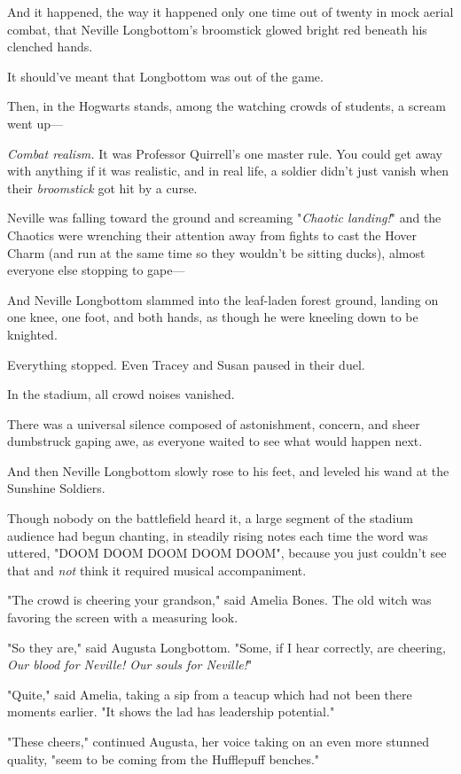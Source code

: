 And it happened, the way it happened only one time out of twenty in mock aerial
combat, that Neville Longbottom's broomstick glowed bright red beneath his
clenched hands.

It should've meant that Longbottom was out of the game.

Then, in the Hogwarts stands, among the watching crowds of students, a scream
went up—

\emph{Combat realism.} It was Professor Quirrell's one master rule. You could
get away with anything if it was realistic, and in real life, a soldier didn't
just vanish when their \emph{broomstick} got hit by a curse.

Neville was falling toward the ground and screaming "\emph{Chaotic landing!}"
and the Chaotics were wrenching their attention away from fights to cast the
Hover Charm (and run at the same time so they wouldn't be sitting ducks),
almost everyone else stopping to gape—

And Neville Longbottom slammed into the leaf-laden forest ground, landing on
one knee, one foot, and both hands, as though he were kneeling down to be
knighted.

Everything stopped. Even Tracey and Susan paused in their duel.

In the stadium, all crowd noises vanished.

There was a universal silence composed of astonishment, concern, and sheer
dumbstruck gaping awe, as everyone waited to see what would happen next.

And then Neville Longbottom slowly rose to his feet, and leveled his wand at
the Sunshine Soldiers.

Though nobody on the battlefield heard it, a large segment of the stadium
audience had begun chanting, in steadily rising notes each time the word was
uttered, "DOOM DOOM DOOM DOOM DOOM", because you just couldn't see that and
\emph{not} think it required musical accompaniment.

"The crowd is cheering your grandson," said Amelia Bones. The old witch was
favoring the screen with a measuring look.

"So they are," said Augusta Longbottom. "Some, if I hear correctly, are
cheering, \emph{Our blood for Neville! Our souls for Neville!}"

"Quite," said Amelia, taking a sip from a teacup which had not been there
moments earlier. "It shows the lad has leadership potential."

"These cheers," continued Augusta, her voice taking on an even more stunned
quality, "seem to be coming from the Hufflepuff benches."


